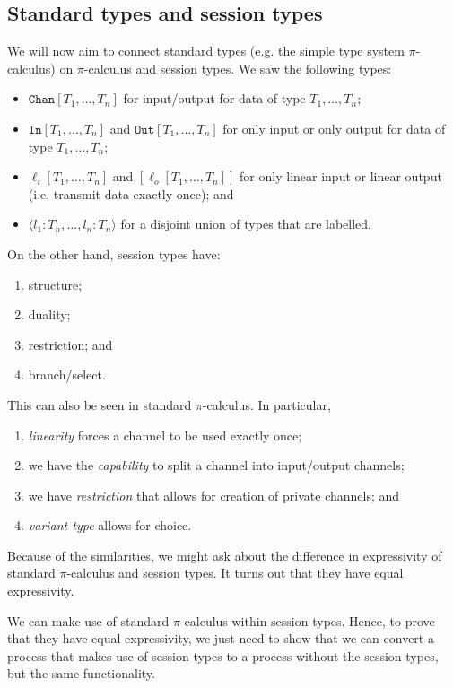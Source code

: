 \documentclass[a4paper, openany]{memoir}
\theoremstyle{definition}
\begin{document}
    \subsection{Standard types and session types}
    We will now aim to connect standard types (e.g. the simple type system $\pi$-calculus) on $\pi$-calculus and session types. We saw the following types:
    \begin{itemize}
        \item $\texttt{Chan}[T_1, \dots, T_n]$ for input/output for data of type $T_1, \dots, T_n$;
        \item $\texttt{In}[T_1, \dots, T_n]$ and $\texttt{Out}[T_1, \dots, T_n]$ for only input or only output for data of type $T_1, \dots, T_n$;
        \item $\ell_i[T_1, \dots, T_n]$ and $[\ell_o[T_1, \dots, T_n]]$ for only linear input or linear output (i.e. transmit data exactly once); and
        \item $\langle l_1 \colon T_n, \dots, l_n \colon T_n \rangle$ for a disjoint union of types that are labelled.
    \end{itemize}
    On the other hand, session types have:
    \begin{enumerate}
        \item structure;
        \item duality;
        \item restriction; and
        \item branch/select.
    \end{enumerate}
    This can also be seen in standard $\pi$-calculus. In particular,
    \begin{enumerate}
        \item \emph{linearity} forces a channel to be used exactly once;
        \item we have the \emph{capability} to split a channel into input/output channels;
        \item we have \emph{restriction} that allows for creation of private channels; and
        \item \emph{variant type} allows for choice.
    \end{enumerate}
    Because of the similarities, we might ask about the difference in expressivity of standard $\pi$-calculus and session types. It turns out that they have equal expressivity.

    We can make use of standard $\pi$-calculus within session types. Hence, to prove that they have equal expressivity, we just need to show that we can convert a process that makes use of session types to a process without the session types, but the same functionality. 
    
\end{document}
